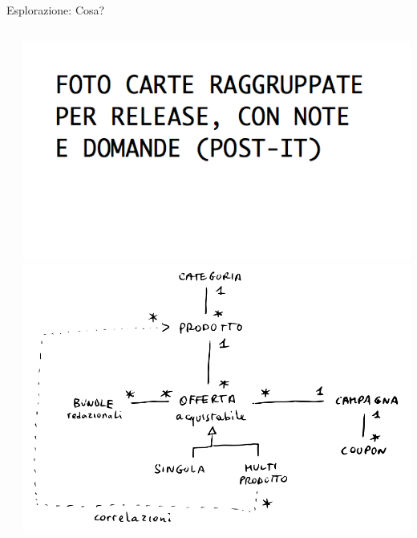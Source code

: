 \documentclass[compress, red, 14pt, pdf]{beamer}
\begin{document}
\begin{frame}{Esplorazione: Cosa?}
\begin{columns}[T]
\begin{column}{0.6\textwidth}
	    \end{column}
	    \begin{column}{0.4\textwidth}
			\hspace*{-0.8cm} \includegraphics[scale=0.25]{images/stories.png}
			\\ \vspace*{0.25cm}
			\hspace*{-0.8cm} \includegraphics[scale=0.15]{images/domain.png}
	    \end{column}
	 \end{columns}
	\end{frame}
\end{document}
